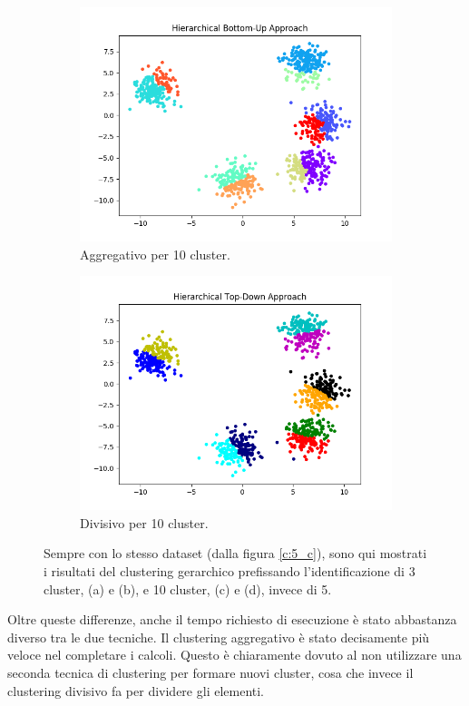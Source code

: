 \documentclass{llncs}
\begin{document}
\begin{figure}[h]
\begin{subfigure}{.5\textwidth}
			\includegraphics[width=\linewidth]{immagini/5_clusters_agg_10.png}
			\caption{Aggregativo per 10 cluster.}
			\label{hier:c}			
		  \end{subfigure}
		  \begin{subfigure}{.5\textwidth}
			\centering
			\includegraphics[width=\linewidth]{immagini/5_clusters_div_10.png}
			\caption{Divisivo per 10 cluster.}
			\label{hier:d}			
		  \end{subfigure}
		\caption{Sempre con lo stesso dataset (dalla figura \ref{c:5_c}), sono qui mostrati i risultati del clustering gerarchico prefissando
		l'identificazione di 3 cluster, (a) e (b), e 10 cluster, (c) e (d), invece di 5.}
		\label{hier:test}
	\end{figure}
	\clearpage
	Oltre queste differenze, anche il tempo richiesto di esecuzione è stato abbastanza diverso tra le due tecniche. Il clustering aggregativo è stato
	decisamente più veloce nel completare i calcoli. Questo è chiaramente dovuto al non utilizzare una seconda tecnica di clustering per formare nuovi cluster, 
	cosa che invece il clustering divisivo fa per dividere gli elementi.
\end{document}
